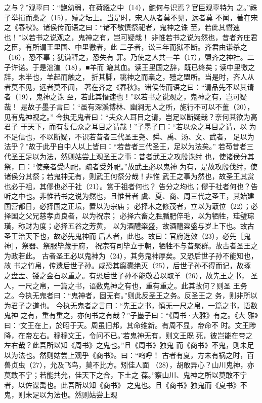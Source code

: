 \documentclass[12pt,UTF8]{ctexbook}
\begin{document}
之与？”观辜曰：“鲍幼弱，在荷繦之中（14），鲍何与识焉？官臣观辜特为 
之。”祩子举揖而槀之（15），殪之坛上。当是时，宋人从者莫不见，远者莫 
不闻，著在宋之《春秋》。诸侯传而语之曰：“诸不敬慎祭祀者，鬼神之诛 
至，若此其憯速也！”以若书之说观之，鬼神之有，岂可疑哉！ 
非惟若书之说为然也，昔者齐庄君之臣，有所谓王里国、中里徼者，此 
二子者，讼三年而狱不断。齐君由谦杀之（16），恐不辜；犹谦释之，恐失有 
罪。乃使之人共一羊（17），盟齐之神社。二子许诺。于是泏洫（18），■羊而 
漉其血。读王里国之辞，既已终矣；读中里徼之辞，未半也，羊起而触之， 
折其脚，祧神之而槀之，殪之盟所。当是时，齐人从者莫不见，远者莫不闻， 
著在齐之《春秋》。诸侯传而语之曰：“请品先不以其请者（19），鬼神之诛 
至，若此其憯速也！”以若书之说观之，鬼神之有，岂可疑哉！ 
是故子墨子言曰：“虽有深溪博林、幽涧无人之所，施行不可以不董（20）， 
见有鬼神视之。” 
今执无鬼者曰：“夫众人耳目之请，岂足以断疑哉？奈何其欲为高君子 
于天下，而有复信众之耳目之请哉！”子墨子曰：“若以众之耳目之请，以 
为不足信也，不以断疑，不识若昔者三代圣王尧、舜、禹、汤、文、武者， 
足以为法乎？”故于此乎自中人以上皆曰：“若昔者三代圣王，足以为法矣。” 
若苟昔者三代圣王足以为法，然则姑尝上观圣王之事：昔者武王之攻殷诛纣 
也，使诸侯分其祭，曰：“使亲者受内祀，疏者受外祀。”故武王必以鬼神 
为有，是故攻殷伐纣，使诸侯分其祭；若鬼神无有，则武王何祭分哉！非惟 
武王之事为然也，故圣王其赏也必于祖，其僇也必于社（21）。赏于祖者何也？ 
告分之均也；僇于社者何也？告听之中也。非惟若书之说为然也，且惟昔者 
虞、夏、商、周三代之圣王，其始建国营都日，必择国之正坛，置以为宗庙； 
必择木之修茂者，立以为菆位（22）；必择国之父兄慈孝贞良者，以为祝宗； 
必择六畜之胜腯肥倅毛，以为牺牲，珪璧琮璜，称财为度；必择五谷之芳黄， 
以为酒醴粢盛，故酒醴粢盛与岁上下也。故古圣王治天下也，故必先鬼神而 
后人者，此也。故曰：官府选效（23），必先［鬼神］，祭器、祭服毕藏于府， 
祝宗有司毕立于朝，牺牲不与昔聚群。故古者圣王之为政若此。 
古者圣王必以鬼神为（24），其务鬼神厚矣。又恐后世子孙不能知也，故 
书之竹帛，传遗后世子孙。咸恐其腐蠹绝灭（25），后世子孙不得而记，故琢 
之盘盂、镂之金石以重之。有恐后世子孙不能敬莙以取羊（26），故先王之书， 
圣人，一尺之帛，一篇之书，语数鬼神之有也，重有重之。此其故何？则圣 
王务之。今执无鬼者曰：“鬼神者，固无有。”则此反圣王之务。反圣王之 
务，则非所以为君子之道也。 
今执无鬼者之言曰：“先王之书，慎无一尺之帛，一篇之书，语数鬼神 
之有，重有重之，亦何书之有哉？”子墨子曰：“《周书·大雅》有之。《大 
雅》曰：‘文王在上，於昭于天。周虽旧邦，其命维新。有周不显，帝命不 
时。文王陟降，在帝左右。穆穆文王，令问不已。’若鬼神无有，则文王既 
死，彼岂能在帝之左右哉？此吾所以知《周书》之鬼也。”且《周书》独鬼 
而《商书》不鬼，则未足以为法也。然则姑尝上观乎《商书》。曰：“呜呼！ 
古者有夏，方未有祸之时，百兽贞虫（27），允及飞鸟，莫不比方。矧佳人面 
（28），胡敢异心？山川鬼神，亦莫敢不宁；若能共允，佳天下之合，下土之 
葆。”察山川、鬼神之所以莫敢不宁者，以佐谋禹也。此吾所以知《商书》 
之鬼也。且《商书》独鬼而《夏书》不鬼，则未足以为法也。然则姑尝上观 
\end{document}
